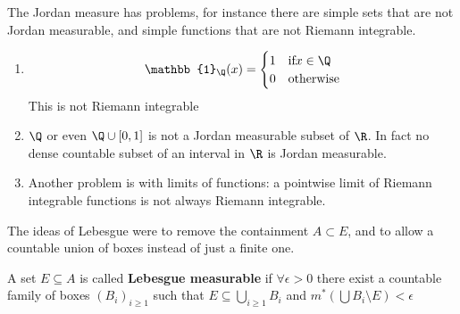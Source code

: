 \documentclass{article}
\begin{document}
The Jordan measure has problems, for instance there are simple sets that are not Jordan measurable, and simple functions that are not Riemann integrable.
\begin{eg}
    \leavevmode
    \begin{enumerate}
        \item
            \begin{equation*}
                \mathbb{1}_\Q(x) = \begin{cases}
                    1 & \text{if} x \in \Q \\
                    0 & \text{otherwise}
                \end{cases}
             \end{equation*}
            This is not Riemann integrable
        \item $\Q$ or even $\Q \cup [0, 1]$ is not a Jordan measurable subset of $\R$. In fact no dense countable subset of an interval in $\R$ is Jordan measurable.
        \item Another problem is with limits of functions: a pointwise limit of Riemann integrable functions is not always Riemann integrable.
    \end{enumerate}
\end{eg}

The ideas of Lebesgue were to remove the containment $A \subset E$, and to allow a countable union of boxes instead of just a finite one.
\begin{defi}
    A set $E \subseteq A$ is called \textbf{Lebesgue measurable} if $\forall \epsilon > 0$ there exist a countable family of boxes $(B_i)_{i \geq 1}$ such that $E \subseteq \bigcup_{i \geq 1} B_i$ and $m^* (\bigcup B_i \setminus E) < \epsilon$
\end{defi}
\end{document}
